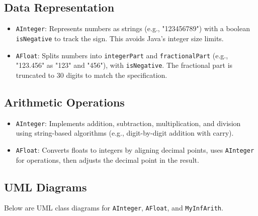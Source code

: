 \documentclass[a4paper,12pt]{article}
\begin{document}
\subsection{Data Representation}
\begin{itemize}
    \item \texttt{AInteger}: Represents numbers as strings (e.g., "123456789") with a boolean \texttt{isNegative} to track the sign. This avoids Java's integer size limits.
    \item \texttt{AFloat}: Splits numbers into \texttt{integerPart} and \texttt{fractionalPart} (e.g., "123.456" as "123" and "456"), with \texttt{isNegative}. The fractional part is truncated to 30 digits to match the specification.
\end{itemize}

\subsection{Arithmetic Operations}
\begin{itemize}
    \item \texttt{AInteger}: Implements addition, subtraction, multiplication, and division using string-based algorithms (e.g., digit-by-digit addition with carry).
    \item \texttt{AFloat}: Converts floats to integers by aligning decimal points, uses \texttt{AInteger} for operations, then adjusts the decimal point in the result.
\end{itemize}

\subsection{UML Diagrams}
Below are UML class diagrams for \texttt{AInteger}, \texttt{AFloat}, and \texttt{MyInfArith}.
\end{document}

